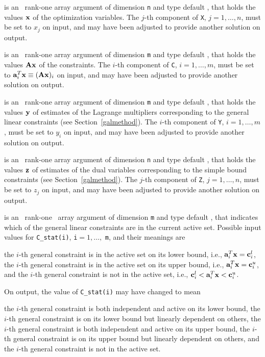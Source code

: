 \documentclass{galahad}
\begin{document}
\begin{description}
 is an \intentinout\ rank-one array argument of dimension {\tt n}
and type default \realdp,
that holds the values ${\mathbf{x}}$ of the optimization variables.
The $j$-th component of {\tt X}, $j = 1,  \ldots , n$, must be set to $x_{j}$
on input, and may have been adjusted to provide another solution on output.

 is an \intentinout\ rank-one array argument of dimension {\tt m}
and type default \realdp, that holds
the values ${\mathbf{A}} {\mathbf{x}}$ of the constraints.
The $i$-th component of {\tt C}, $i = 1,  \ldots ,  m$, must be set to
${\mathbf{a}}_{i}^{T}{\mathbf{x}} \equiv ({\mathbf{A}} {\mathbf{x}})_{i}$
on input, and may have been adjusted to provide another solution on output.

 is an \intentinout\ rank-one array argument of dimension {\tt m}
and type default \realdp, that holds
the values ${\mathbf{y}}$ of estimates  of the Lagrange multipliers
corresponding to the general linear constraints (see Section~\ref{galmethod}).
The $i$-th component of {\tt Y}, $i = 1,  \ldots ,  m$, must be set to $y_{i}$
on input, and may have been adjusted to provide another solution on output.

 is an \intentinout\ rank-one array argument of dimension {\tt n}
and type default \realdp, that holds
the values ${\mathbf{z}}$ of estimates  of the dual variables
corresponding to the simple bound constraints (see Section~\ref{galmethod}).
The $j$-th component of {\tt Z}, $j = 1,  \ldots ,  n$, must be set to $z_{j}$
on input, and may have been adjusted to provide another solution on output.

 is an \intentin\ rank-one \intentinout\ array argument of
dimension {\tt m}
and type default \integer, that indicates which of the general linear
constraints are in the current active set. Possible input values for
{\tt C\_stat(i)}, {\tt i}$=1, \ldots ,$ {\tt m}, and their meanings are
\begin{description}
 the $i$-th general constraint
is in the active set on its lower bound, i.e., ${\mathbf{a}}_i^T {\mathbf{x}} = {\mathbf{c}}_i^{l}$,
 the $i$-th general constraint
is in the active set on its upper bound, i.e., ${\mathbf{a}}_i^T {\mathbf{x}} = {\mathbf{c}}_i^{u}$,
and
  the $i$-th general constraint is not in the active set,
i.e., ${\mathbf{c}}_i^{l} < {\mathbf{a}}_i^T {\mathbf{x}} < {\mathbf{c}}_i^{u}$.
\end{description}
On output, the value of {\tt C\_stat(i)} may have changed to mean
\begin{description}
 the $i$-th general constraint
is both independent and active on its lower bound,
 the $i$-th general constraint
is on its lower bound but linearly dependent on others,
 the $i$-th general constraint
is both independent and active on its upper bound,
 the $i$-th general constraint
is on its upper bound but linearly dependent on others, and
 the $i$-th general constraint is not in the active set.
\end{description}



\end{description}
\end{document}
